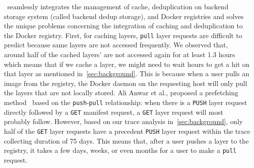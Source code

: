 \sysname~seamlessly integrates the management of cache, deduplication on
backend storage system (called backend dedup storage), and Docker registries
and solves the unique problems concerning the integration
of caching and deduplication to the Docker registry.
First, for caching layers, \texttt{pull} layer requests are difficult to
predict because same layers are not accessed frequently.
We observed that, around half of the cached layers' are not
accessed again for at least 1.3 hours which means that if we
cache a layer, we might need to wait hours to get a hit on that layer as mentioned in~\cref{sec:background}.  
This is
because when a user pulls an image from the registry, the Docker daemon on the
requesting host will only pull the layers that are not locally stored.
Ali Anwar et
al., proposed a prefetching method~\cite{dockerworkload} based on the
\texttt{push}-\texttt{pull} relationship: when there is a \texttt{PUSH} layer
request directly followed by a \texttt{GET} manifest request, a \texttt{GET}
layer request will most probably follow. 
However, based on our trace analysis in~\cref{sec:background},
only half of the \texttt{GET} layer
requests have a precedent \texttt{PUSH} layer request within the trace
collecting duration of 75 days. This means that, after a user pushes a layer
to the registry, it takes a few days, weeks, or even months for a user to make
a \texttt{pull} request.

